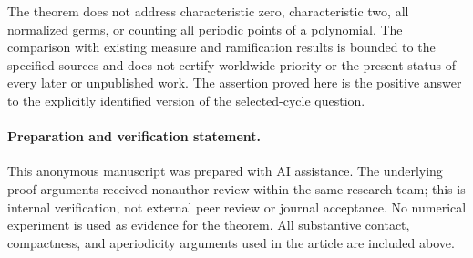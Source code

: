 The theorem does not address characteristic zero, characteristic two,
all normalized germs, or counting all periodic points of a polynomial.
The comparison with existing measure and ramification results is
bounded to the specified sources and does not certify worldwide
priority or the present status of every later or unpublished work.
The assertion proved here is the positive answer to the explicitly
identified version of the selected-cycle question.

\paragraph{Preparation and verification statement.}
This anonymous manuscript was prepared with AI assistance. The
underlying proof arguments received nonauthor review within the same
research team; this is internal verification, not external peer
review or journal acceptance. No numerical experiment is used as
evidence for the theorem. All substantive contact, compactness, and
aperiodicity arguments used in the article are included above.
